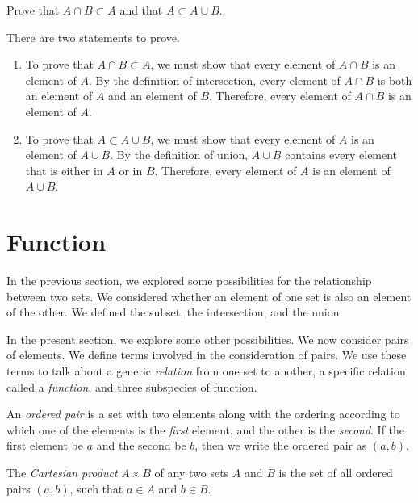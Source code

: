 \begin{exercise}
   Prove that $A \cap B \subset A$ and that $A \subset A \cup B$.
   \begin{solution}
      There are two statements to prove.
      \begin{enumerate}
         \item To prove that $A \cap B \subset A$, we must show that every
            element of $A \cap B$ is an element of $A$. By the definition of
            intersection, every element of $A \cap B$ is both an element of $A$
            and an element of $B$. Therefore, every element of $A \cap B$ is an
            element of $A$.
         \item To prove that $A \subset A \cup B$, we must show that every
            element of $A$ is an element of $A \cup B$. By the definition of
            union, $A \cup B$ contains every element that is either in $A$ or
            in $B$. Therefore, every element of $A$ is an element of $A \cup
            B$.
      \end{enumerate}
   \end{solution}
\end{exercise}

\section{Function}

In the previous section, we explored some possibilities for the relationship
between two sets.  We considered whether an element of one set is also an
element of the other. We defined the subset, the intersection, and the union.

In the present section, we explore some other possibilities. We now consider
pairs of elements. We define terms involved in the consideration of pairs. We
use these terms to talk about a generic \emph{relation} from one set to
another, a specific relation called a \emph{function}, and three subspecies of
function.

\begin{definition}
   An \emph{ordered pair} is a set with two elements along with the ordering
   according to which one of the elements is the \emph{first} element, and the
   other is the \emph{second}. If the first element be $a$ and the second be
   $b$, then we write the ordered pair as $(a,b)$.
\end{definition}

\begin{definition}
   The \emph{Cartesian product} $A \times B$ of any two sets $A$ and $B$ is the
   set of all ordered pairs $(a,b)$, such that $a \in A$ and $b \in B$.
\end{definition}

